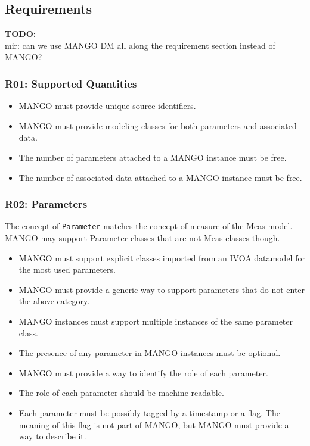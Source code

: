 \documentclass[11pt,a4paper]{ivoa}
\newcommand{\TODO}[1]{%
    \noindent%
    \colorbox{todocolor}{%
            \parbox{0.85\linewidth}{\sffamily \textbf{TODO:}\\
            #1}
    }%
    \vspace{2pt}

}
\begin{document}
\subsection{Requirements}
\TODO{mir: can we use MANGO DM all along the requirement section instead of MANGO?  }

\subsubsection{R01: Supported Quantities}
\begin{itemize}
    \item MANGO must provide unique source identifiers.
    \item MANGO must provide modeling classes for both parameters and associated data.
    \item The number of parameters attached to a MANGO instance must be free.
    \item The number of associated data attached to a MANGO instance must be free.
\end{itemize}

\subsubsection{R02: Parameters}
The concept of \texttt{Parameter} matches the concept of measure of the Meas model. MANGO may support Parameter classes that are not Meas classes though.


\begin{itemize}
    \item MANGO must support explicit classes imported from an IVOA datamodel for the most used parameters.
    \item MANGO must provide a generic way to support parameters that do not enter the above category.
    \item MANGO instances must support multiple instances of the same parameter class.
    \item The presence of any parameter in MANGO instances must be optional.
    \item MANGO must provide a way to identify the role of each parameter.
    \item The role of each parameter should be machine-readable.
    \item Each parameter must be possibly tagged by a timestamp or a flag. The meaning of this flag is not part of MANGO, but MANGO must provide a way to describe it.
\end{itemize}
\end{document}
